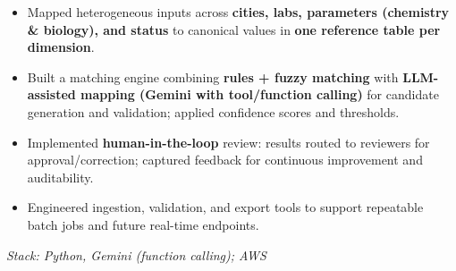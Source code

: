 \documentclass[10pt,a4paper]{altacv}
\begin{document}
\divider

\begin{itemize}
  \item Mapped heterogeneous inputs across \textbf{cities, labs, parameters (chemistry \& biology), and status} to canonical values in \textbf{one reference table per dimension}.
  \item Built a matching engine combining \textbf{rules + fuzzy matching} with \textbf{LLM-assisted mapping (Gemini with tool/function calling)} for candidate generation and validation; applied confidence scores and thresholds.
  \item Implemented \textbf{human-in-the-loop} review: results routed to reviewers for approval/correction; captured feedback for continuous improvement and auditability.\
  \item Engineered ingestion, validation, and export tools to support repeatable batch jobs and future real-time endpoints.
\end{itemize}
\textit{Stack: Python, Gemini (function calling); AWS}

\divider

\end{document}
